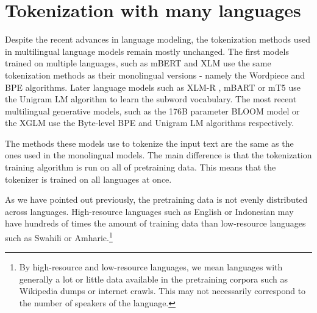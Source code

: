 


\section{Tokenization with many languages}

Despite the recent advances in language modeling, the tokenization methods used in multilingual language models remain mostly unchanged. The first models trained on multiple languages, such as mBERT \cite{devlin_bert_2019,devlin_bertmultilingualmd_2019} and XLM \cite{lample_cross-lingual_2019} use the same tokenization methods as their monolingual versions - namely the Wordpiece and BPE algorithms. Later language models such as XLM-R \cite{conneau_unsupervised_2020}, mBART \cite{liu_multilingual_2020} or mT5 \cite{xue_mt5_2021} use the Unigram LM algorithm to learn the subword vocabulary. The most recent multilingual generative models, such as the 176B parameter BLOOM model \cite{scao_bloom_2022} or the XGLM \cite{lin_few-shot_2022} use the Byte-level BPE and Unigram LM algorithms respectively.

The methods these models use to tokenize the input text are the same as the ones used in the monolingual models. The main difference is that the tokenization training algorithm is run on all of pretraining data. This means that the tokenizer is trained on all languages at once. 

As we have pointed out previously, the pretraining data is not evenly distributed across languages. High-resource languages such as English or Indonesian may have hundreds of times the amount of training data than low-resource languages such as Swahili or Amharic.\footnote{By high-resource and low-resource languages, we mean languages with generally a lot or little data available in the pretraining corpora such as Wikipedia dumps or internet crawls. This may not necessarily correspond to the number of speakers of the language.}


